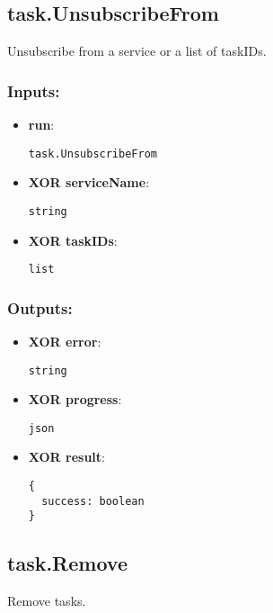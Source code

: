 \subsection{task.UnsubscribeFrom}
\label{ch:builtinservices:task.UnsubscribeFrom}
Unsubscribe from a service or a list of taskIDs.
\subsubsection*{Inputs:}
\begin{itemize}
    \item \textbf{run}: 
\begin{lstlisting}
task.UnsubscribeFrom
\end{lstlisting}
    \item \textbf{XOR serviceName}: 
\begin{lstlisting}
string
\end{lstlisting}
    \item \textbf{XOR taskIDs}: 
\begin{lstlisting}
list
\end{lstlisting}
  \end{itemize}

\subsubsection*{Outputs:}
\begin{itemize}
    \item \textbf{XOR error}: 
\begin{lstlisting}
string
\end{lstlisting}
    \item \textbf{XOR progress}: 
\begin{lstlisting}
json
\end{lstlisting}
    \item \textbf{XOR result}: 
\begin{lstlisting}
{
  success: boolean
}
\end{lstlisting}
  \end{itemize}

\subsection{task.Remove}
\label{ch:builtinservices:task.Remove}
Remove tasks.
